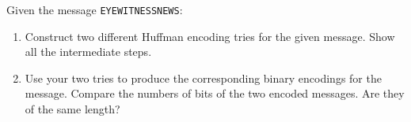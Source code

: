 Given the message {\tt EYEWITNESSNEWS}:

\begin{enumerate}

	\item  Construct two different Huffman encoding tries for the
	given message.  Show all the intermediate steps.

	\item  Use your two tries to produce the corresponding binary
	encodings for the message.  Compare the numbers of bits of the
	two encoded messages.  Are they of the same length?

	\end{enumerate}

